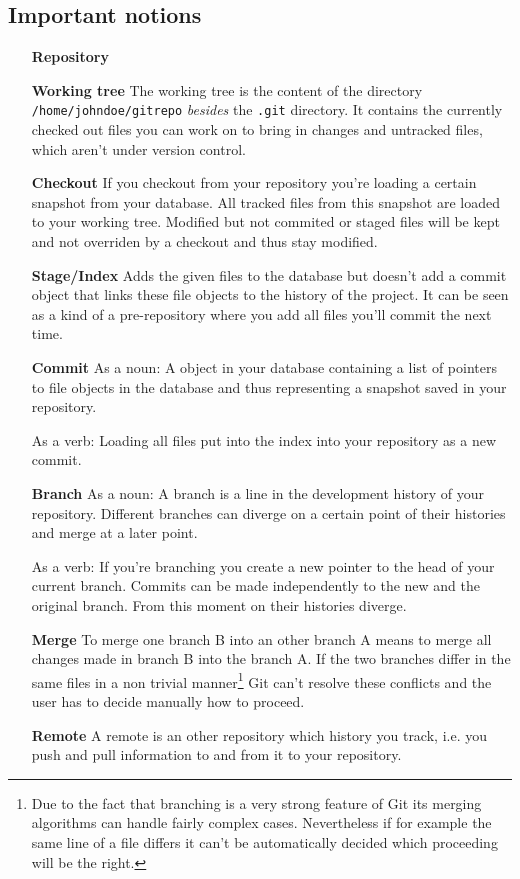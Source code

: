 \documentclass[a4paper,10pt]{scrartcl}
\begin{document}
\subsection*{Important notions}
\begin{itemize}
  \item[\textbf{Repository}] 
  \item[\textbf{Working tree}] The working tree is the content of the directory \texttt{/home/johndoe/gitrepo} \textit{besides} the \texttt{.git} directory. It contains the currently checked out files you can work on to bring in changes and untracked files, which aren't under version control.
  \item[\textbf{Checkout}] If you checkout from your repository you're loading a certain snapshot from your database. All tracked files from this snapshot are loaded to your working tree. Modified but not commited or staged files will be kept and not overriden by a checkout and thus stay modified.
 \item[\textbf{Stage/Index}] Adds the given files to the database but doesn't add a commit object that links these file objects to the history of the project. It can be seen as a kind of a pre-repository where you add all files you'll commit the next time. 
  \item[\textbf{Commit}] As a noun: A object in your database containing a list of pointers to file objects in the database and thus representing a snapshot saved in your repository.\smallskip

    As a verb: Loading all files put into the index into your repository as a new commit.
  \item[\textbf{Branch}] As a noun: A branch is a line in the development history of your repository. Different branches can diverge on a certain point of their histories and merge at a later point.\smallskip

    As a verb: If you're branching you create a new pointer to the head of your current branch. Commits can be made independently to the new and the original branch. From this moment on their histories diverge.
  \item[\textbf{Merge}] To merge one branch B into an other branch A means to merge all changes made in branch B into the branch A. If the two branches differ in the same files in a non trivial manner\footnote{Due to the fact that branching is a very strong feature of Git its merging algorithms can handle fairly complex cases. Nevertheless if for example the same line of a file differs it can't be automatically decided which proceeding will be the right.} Git can't resolve these conflicts and the user has to decide manually how to proceed.
  \item[\textbf{Remote}] A remote is an other repository which history you track, i.e. you push and pull information to and from it to your repository.


\end{itemize}
\end{document}
